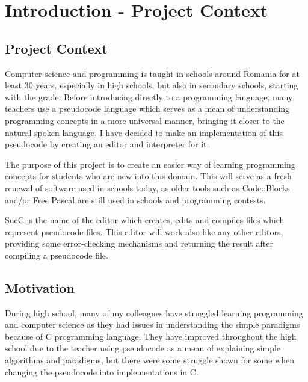 \documentclass[12pt,a4paper,twoside]{report}
\begin{document}
\newpage

\setcounter{page}{1}

\newpage
\tableofcontents
\newpage


\setcounter{page}{1}

\chapter{Introduction - Project Context}
\pagestyle{headings}
\section{Project Context}

	Computer science and programming is taught in schools around Romania for at least 30 years, especially in high schools, but also in secondary schools, starting with the  grade. Before introducing directly to a programming language, many teachers use a pseudocode language which serves as a mean of understanding programming concepts in a more universal manner, bringing it closer to the natural spoken language. I have decided to make an implementation of this pseudocode by creating an editor and interpreter for it.
	
	The purpose of this project is to create an easier way of learning programming concepts for students who are new into this domain. This will serve as a fresh renewal of software used in schools today, as older tools such as Code::Blocks and/or Free Pascal are still used in schools and programming contests.
 
	SueC is the name of the editor which creates, edits and compiles files which represent pseudocode files. This editor will work also like any other editors, providing some error-checking mechanisms and returning the result after compiling a pseudocode file.
	
	
\section{Motivation}
	During high school, many of my colleagues have struggled learning programming and computer science as they had issues in understanding the simple paradigms because of C programming language. They have improved throughout the high school due to the teacher using pseudocode as a mean of explaining simple algorithms and paradigms, but there were some struggle shown for some when changing the pseudocode into implementations in C. 
	
\end{document}
